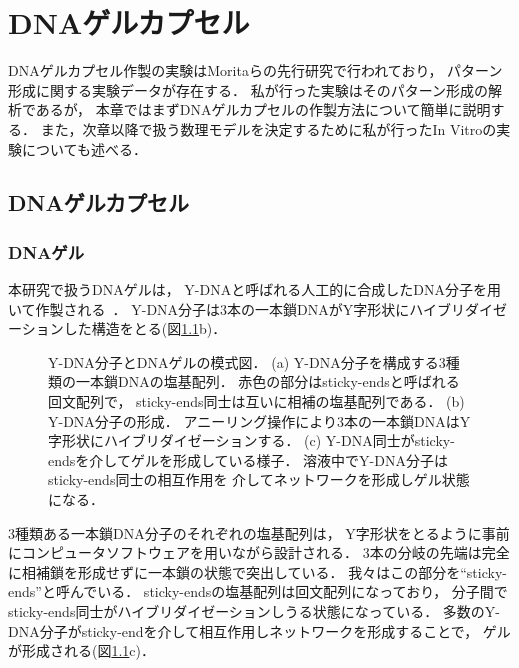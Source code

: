 \chapter{DNAゲルカプセル}
\label{sec:dnagel}

DNAゲルカプセル作製の実験はMoritaらの先行研究で行われており，
パターン形成に関する実験データが存在する\cite{moritasan}．
私が行った実験はそのパターン形成の解析であるが，
本章ではまずDNAゲルカプセルの作製方法について簡単に説明する．
また，次章以降で扱う数理モデルを決定するために私が行ったIn Vitroの実験についても述べる．

\section{DNAゲルカプセル}

\subsection{DNAゲル}
本研究で扱うDNAゲルは，
Y-DNAと呼ばれる人工的に合成したDNA分子を用いて作製される~\cite{morita2017formation}．
Y-DNA分子は3本の一本鎖DNAがY字形状にハイブリダイゼーションした構造をとる(図\ref{fig:ydna}b)．
\begin{figure}
    \centering
    
    \caption{Y-DNA分子とDNAゲルの模式図．
        (a) Y-DNA分子を構成する3種類の一本鎖DNAの塩基配列．
            赤色の部分はsticky-endsと呼ばれる回文配列で，
            sticky-ends同士は互いに相補の塩基配列である．
        (b) Y-DNA分子の形成．
            アニーリング操作により3本の一本鎖DNAはY字形状にハイブリダイゼーションする．
        (c) Y-DNA同士がsticky-endsを介してゲルを形成している様子．
            溶液中でY-DNA分子はsticky-ends同士の相互作用を
            介してネットワークを形成しゲル状態になる．
    }
    \label{fig:ydna}
\end{figure}
3種類ある一本鎖DNA分子のそれぞれの塩基配列は，
Y字形状をとるように事前にコンピュータソフトウェア\cite{zadeh2011nupack}を用いながら設計される．
3本の分岐の先端は完全に相補鎖を形成せずに一本鎖の状態で突出している．
我々はこの部分を``sticky-ends''と呼んでいる．
sticky-endsの塩基配列は回文配列になっており，
分子間でsticky-ends同士がハイブリダイゼーションしうる状態になっている．
多数のY-DNA分子がsticky-endを介して相互作用しネットワークを形成することで，
ゲルが形成される(図\ref{fig:ydna}c)．

